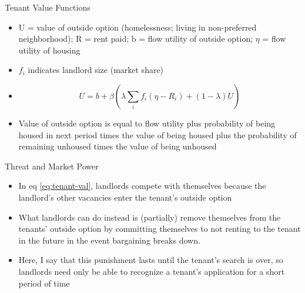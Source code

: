 \documentclass[10pt, xcolor=dvipsnames]{beamer}
\begin{document}
\begin{frame}{Tenant Value Functions}
\begin{itemize}
    \item U = value of outside option (homelessness; living in non-preferred neighborhood); R = rent paid; b = flow utility of outside option; $\eta$ = flow utility of housing
    \item $f_i$ indicates landlord size (market share)
    \item \begin{equation}
        U = b + \beta\left(\lambda \sum_{i} f_i(\eta - R_i) + (1-\lambda)U\right)\label{eq:tenant-val}
    \end{equation}
    \item Value of outside option is equal to flow utility plus probability of being housed in next period times the value of being housed plus the probability of remaining unhoused times the value of being unhoused
\end{itemize}
\end{frame}

\begin{frame}{Threat and Market Power}
    \begin{itemize}
    \item In eq \ref{eq:tenant-val}, landlords compete with themselves because the landlord's other vacancies enter the tenant's outside option
    \item What landlords can do instead is (partially) remove themselves from the tenants' outside option by committing themselves to not renting to the tenant in the future in the event bargaining breaks down.
    \item Here, I say that this punishment lasts until the tenant's search is over, so landlords need only be able to recognize a tenant's application for a short period of time
    \end{itemize}
\end{frame}
\end{document}
